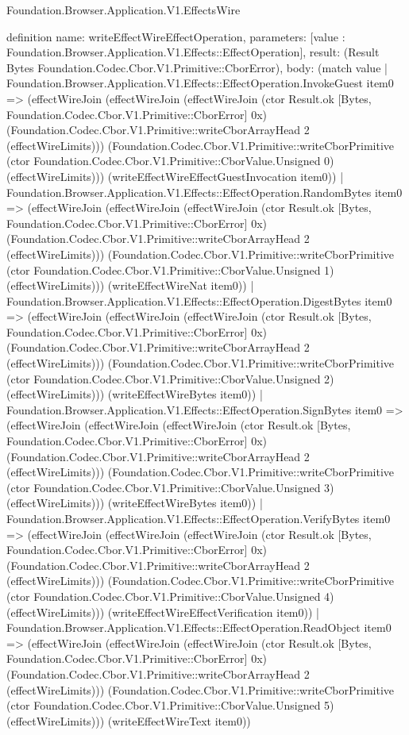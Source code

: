 \begin{lexlean}{Foundation.Browser.Application.V1.EffectsWire}
\begin{semanticmodule}
definition{
  name: writeEffectWireEffectOperation,
  parameters: [value : Foundation.Browser.Application.V1.Effects::EffectOperation],
  result: (Result Bytes Foundation.Codec.Cbor.V1.Primitive::CborError),
  body: (match value
    | Foundation.Browser.Application.V1.Effects::EffectOperation.InvokeGuest item0 => (effectWireJoin (effectWireJoin (effectWireJoin (ctor Result.ok [Bytes, Foundation.Codec.Cbor.V1.Primitive::CborError] 0x) (Foundation.Codec.Cbor.V1.Primitive::writeCborArrayHead 2 (effectWireLimits))) (Foundation.Codec.Cbor.V1.Primitive::writeCborPrimitive (ctor Foundation.Codec.Cbor.V1.Primitive::CborValue.Unsigned 0) (effectWireLimits))) (writeEffectWireEffectGuestInvocation item0))
    | Foundation.Browser.Application.V1.Effects::EffectOperation.RandomBytes item0 => (effectWireJoin (effectWireJoin (effectWireJoin (ctor Result.ok [Bytes, Foundation.Codec.Cbor.V1.Primitive::CborError] 0x) (Foundation.Codec.Cbor.V1.Primitive::writeCborArrayHead 2 (effectWireLimits))) (Foundation.Codec.Cbor.V1.Primitive::writeCborPrimitive (ctor Foundation.Codec.Cbor.V1.Primitive::CborValue.Unsigned 1) (effectWireLimits))) (writeEffectWireNat item0))
    | Foundation.Browser.Application.V1.Effects::EffectOperation.DigestBytes item0 => (effectWireJoin (effectWireJoin (effectWireJoin (ctor Result.ok [Bytes, Foundation.Codec.Cbor.V1.Primitive::CborError] 0x) (Foundation.Codec.Cbor.V1.Primitive::writeCborArrayHead 2 (effectWireLimits))) (Foundation.Codec.Cbor.V1.Primitive::writeCborPrimitive (ctor Foundation.Codec.Cbor.V1.Primitive::CborValue.Unsigned 2) (effectWireLimits))) (writeEffectWireBytes item0))
    | Foundation.Browser.Application.V1.Effects::EffectOperation.SignBytes item0 => (effectWireJoin (effectWireJoin (effectWireJoin (ctor Result.ok [Bytes, Foundation.Codec.Cbor.V1.Primitive::CborError] 0x) (Foundation.Codec.Cbor.V1.Primitive::writeCborArrayHead 2 (effectWireLimits))) (Foundation.Codec.Cbor.V1.Primitive::writeCborPrimitive (ctor Foundation.Codec.Cbor.V1.Primitive::CborValue.Unsigned 3) (effectWireLimits))) (writeEffectWireBytes item0))
    | Foundation.Browser.Application.V1.Effects::EffectOperation.VerifyBytes item0 => (effectWireJoin (effectWireJoin (effectWireJoin (ctor Result.ok [Bytes, Foundation.Codec.Cbor.V1.Primitive::CborError] 0x) (Foundation.Codec.Cbor.V1.Primitive::writeCborArrayHead 2 (effectWireLimits))) (Foundation.Codec.Cbor.V1.Primitive::writeCborPrimitive (ctor Foundation.Codec.Cbor.V1.Primitive::CborValue.Unsigned 4) (effectWireLimits))) (writeEffectWireEffectVerification item0))
    | Foundation.Browser.Application.V1.Effects::EffectOperation.ReadObject item0 => (effectWireJoin (effectWireJoin (effectWireJoin (ctor Result.ok [Bytes, Foundation.Codec.Cbor.V1.Primitive::CborError] 0x) (Foundation.Codec.Cbor.V1.Primitive::writeCborArrayHead 2 (effectWireLimits))) (Foundation.Codec.Cbor.V1.Primitive::writeCborPrimitive (ctor Foundation.Codec.Cbor.V1.Primitive::CborValue.Unsigned 5) (effectWireLimits))) (writeEffectWireText item0))
}
\end{semanticmodule}
\end{lexlean}
